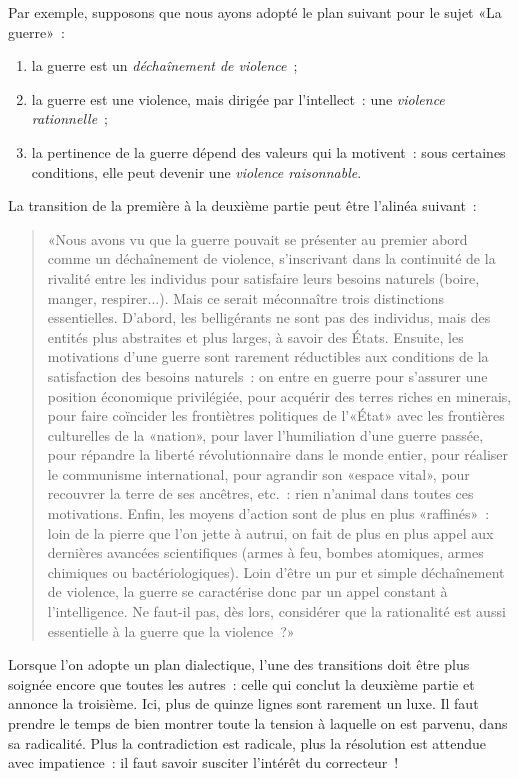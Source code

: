 \documentclass[a4paper,11pt]{article}
\begin{document}
Par exemple, supposons que nous ayons adopté le plan suivant pour le
sujet «La guerre»~:
\begin{enumerate}
\item la guerre est un \emph{déchaînement de violence}~;
\item la guerre est une violence, mais dirigée par l'intellect~: une
  \emph{violence rationnelle}~;
\item la pertinence de la guerre dépend des valeurs qui la motivent~:
  sous certaines conditions, elle peut devenir une \emph{violence
    raisonnable}.
\end{enumerate}
La transition de la première à la deuxième partie peut être l'alinéa
suivant~:
\begin{quote}
  «Nous avons vu que la guerre pouvait se présenter au premier abord
  comme un déchaînement de violence, s'inscrivant dans la continuité de
  la rivalité entre les individus pour satisfaire leurs besoins naturels
  (boire, manger, respirer...). Mais ce serait méconnaître trois
  distinctions essentielles. D'abord, les belligérants ne sont pas des
  individus, mais des entités plus abstraites et plus larges, à savoir
  des États. Ensuite, les motivations d'une guerre sont rarement
  réductibles aux conditions de la satisfaction des besoins naturels~:
  on entre en guerre pour s'assurer une position économique privilégiée,
  pour acquérir des terres riches en minerais, pour faire coïncider les
  frontiètres politiques de l'«État» avec les frontières culturelles de
  la «nation», pour laver l'humiliation d'une guerre passée, pour
  répandre la liberté révolutionnaire dans le monde entier, pour
  réaliser le communisme international, pour agrandir son «espace
  vital», pour recouvrer la terre de ses ancêtres, etc.~: rien n'animal
  dans toutes ces motivations. Enfin, les moyens d'action sont de plus
  en plus «raffinés»~: loin de la pierre que l'on jette à autrui, on
  fait de plus en plus appel aux dernières avancées scientifiques (armes
  à feu, bombes atomiques, armes chimiques ou bactériologiques). Loin
  d'être un pur et simple déchaînement de violence, la guerre se
  caractérise donc par un appel constant à l'intelligence. Ne faut-il
  pas, dès lors, considérer que la rationalité est aussi essentielle à
  la guerre que la violence~?»
\end{quote}

\par

Lorsque l'on adopte un plan dialectique, l'une des transitions doit être
plus soignée encore que toutes les autres~: celle qui conclut la
deuxième partie et annonce la troisième. Ici, plus de quinze lignes sont
rarement un luxe. Il faut prendre le temps de bien montrer toute la
tension à laquelle on est parvenu, dans sa radicalité. Plus la
contradiction est radicale, plus la résolution est attendue avec
impatience~: il faut savoir susciter l'intérêt du correcteur~!
\end{document}
